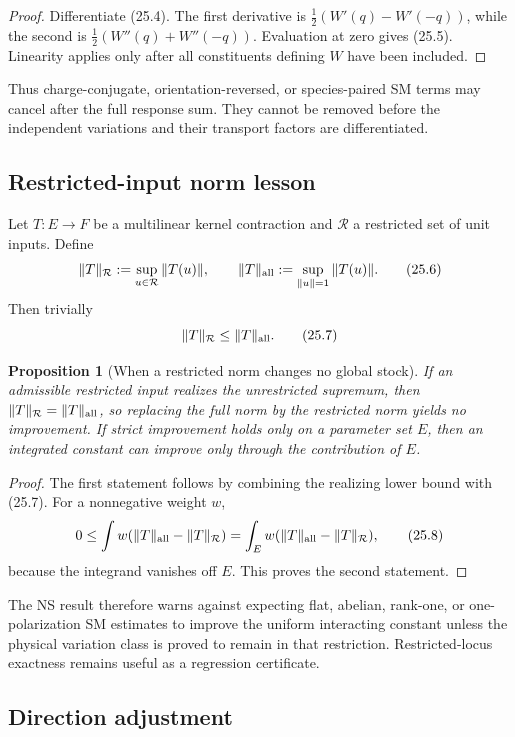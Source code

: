 \documentclass[11pt]{article}
\newtheorem{proposition}[theorem]{Proposition}
\begin{document}
\begin{proof}
Differentiate (25.4).  The first derivative is
\(\frac12(W'(q)-W'(-q))\), while the second is
\(\frac12(W''(q)+W''(-q))\).  Evaluation at zero gives (25.5).
Linearity applies only after all constituents defining \(W\) have been
included.
\end{proof}

Thus charge-conjugate, orientation-reversed, or species-paired SM terms
may cancel after the full response sum.  They cannot be removed before
the independent variations and their transport factors are
differentiated.

\subsection{Restricted-input norm lesson}

Let \(T:E\to F\) be a multilinear kernel contraction and
\(\mathcal R\) a restricted set of unit inputs.  Define
\[
 \|T\|_{\mathcal R}:=\sup_{u\in\mathcal R}\|T(u)\|,
 \qquad
 \|T\|_{\rm all}:=\sup_{\|u\|=1}\|T(u)\|.
 \tag{25.6}
\]
Then trivially
\[
 \|T\|_{\mathcal R}\leq\|T\|_{\rm all}.
 \tag{25.7}
\]

\begin{proposition}[When a restricted norm changes no global stock]
\label{prop:v11v25-restricted}
If an admissible restricted input realizes the unrestricted supremum,
then \(\|T\|_{\mathcal R}=\|T\|_{\rm all}\), so replacing the full norm
by the restricted norm yields no improvement.  If strict improvement
holds only on a parameter set \(E\), then an integrated constant can
improve only through the contribution of \(E\).
\end{proposition}

\begin{proof}
The first statement follows by combining the realizing lower bound with
(25.7).  For a nonnegative weight \(w\),
\[
 0\leq
 \int w(\|T\|_{\rm all}-\|T\|_{\mathcal R})
 =
 \int_Ew(\|T\|_{\rm all}-\|T\|_{\mathcal R}),
 \tag{25.8}
\]
because the integrand vanishes off \(E\).  This proves the second
statement.
\end{proof}

The NS result therefore warns against expecting flat, abelian, rank-one,
or one-polarization SM estimates to improve the uniform interacting
constant unless the physical variation class is proved to remain in
that restriction.  Restricted-locus exactness remains useful as a
regression certificate.

\subsection{Direction adjustment}
\end{document}
